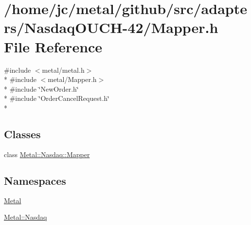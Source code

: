 \hypertarget{adapters_2NasdaqOUCH-42_2Mapper_8h}{}\section{/home/jc/metal/github/src/adapters/\+Nasdaq\+O\+U\+C\+H-\/42/\+Mapper.h File Reference}
\label{adapters_2NasdaqOUCH-42_2Mapper_8h}
{\ttfamily \#include $<$metal/metal.\+h$>$}\\*
{\ttfamily \#include $<$metal/\+Mapper.\+h$>$}\\*
{\ttfamily \#include \char`\"{}New\+Order.\+h\char`\"{}}\\*
{\ttfamily \#include \char`\"{}Order\+Cancel\+Request.\+h\char`\"{}}\\*
\subsection*{Classes}
\begin{DoxyCompactItemize}
\item 
class \hyperlink{classMetal_1_1Nasdaq_1_1Mapper}{Metal\+::\+Nasdaq\+::\+Mapper}
\end{DoxyCompactItemize}
\subsection*{Namespaces}
\begin{DoxyCompactItemize}
\item 
 \hyperlink{namespaceMetal}{Metal}
\item 
 \hyperlink{namespaceMetal_1_1Nasdaq}{Metal\+::\+Nasdaq}
\end{DoxyCompactItemize}
